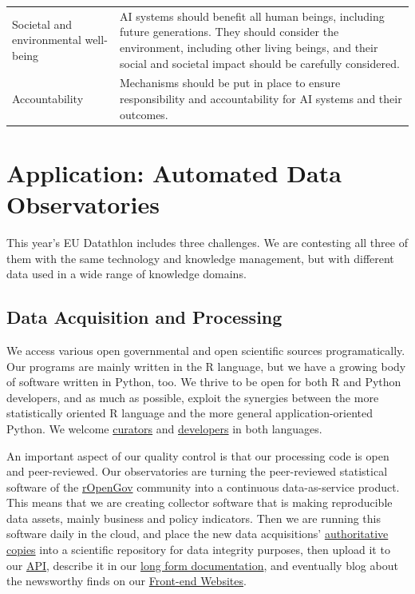 \documentclass[
  a4paper,
  openany, a4paper, oneside]{book}
\begin{document}
\begin{longtable}[]{@{}
  >{\raggedright\arraybackslash}p{}
  >{\centering\arraybackslash}p{}@{}}
Societal and environmental well-being & AI systems should benefit all human beings, including future generations. They should consider the environment, including other living beings, and their social and societal impact should be carefully considered. \\
Accountability & Mechanisms should be put in place to ensure responsibility and accountability for AI systems and their outcomes. \\
\bottomrule
\end{longtable}

\hypertarget{app}{%
\chapter{Application: Automated Data Observatories}\label{app}}

This year's EU Datathlon includes three challenges. We are contesting all three of them with the same technology and knowledge management, but with different data used in a wide range of knowledge domains.

\hypertarget{data-acquisition-and-processing}{%
\section{Data Acquisition and Processing}\label{data-acquisition-and-processing}}

We access various open governmental and open scientific sources programatically. Our programs are mainly written in the R language, but we have a growing body of software written in Python, too. We thrive to be open for both R and Python developers, and as much as possible, exploit the synergies between the more statistically oriented R language and the more general application-oriented Python. We welcome \href{https://economy.dataobservatory.eu/authors/curator/}{curators} and \href{https://greendeal.dataobservatory.eu/authors/developer/}{developers} in both languages.

An important aspect of our quality control is that our processing code is open and peer-reviewed. Our observatories are turning the peer-reviewed statistical software of the \href{http://ropengov.org/}{rOpenGov} community into a continuous data-as-service product. This means that we are creating collector software that is making reproducible data assets, mainly business and policy indicators. Then we are running this software daily in the cloud, and place the new data acquisitions' \protect\hyperlink{zenodo}{authoritative copies} into a scientific repository for data integrity purposes, then upload it to our \protect\hyperlink{api}{API}, describe it in our \protect\hyperlink{bookdown}{long form documentation}, and eventually blog about the newsworthy finds on our \protect\hyperlink{hugo}{Front-end Websites}.
\end{document}
